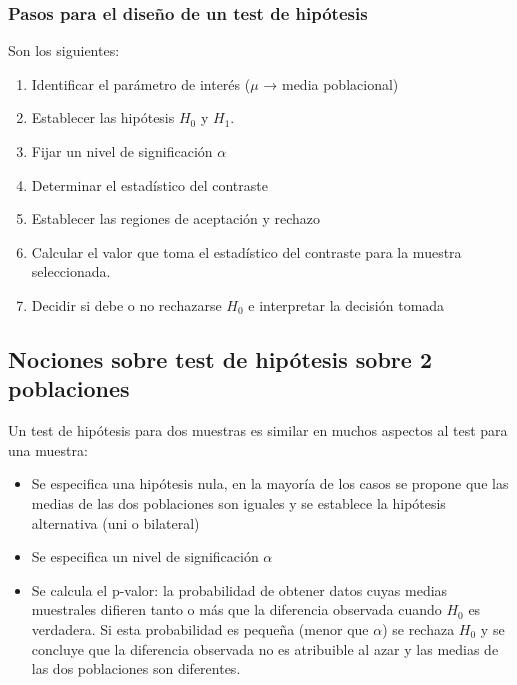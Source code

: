 \documentclass[11pt]{article}
\providecommand{\tightlist}{%
      \setlength{\itemsep}{0pt}\setlength{\parskip}{0pt}}
\begin{document}
\subsubsection{Pasos para el diseño de un test de
hipótesis}\label{pasos-para-el-diseuxf1o-de-un-test-de-hipuxf3tesis}

Son los siguientes:

\begin{enumerate}
\def\labelenumi{\arabic{enumi}.}
\tightlist
\item
  Identificar el parámetro de interés (\(\mu\) → media poblacional)
\item
  Establecer las hipótesis \(H_0\) y \(H_1\).
\item
  Fijar un nivel de significación \(\alpha\)
\item
  Determinar el estadístico del contraste
\item
  Establecer las regiones de aceptación y rechazo
\item
  Calcular el valor que toma el estadístico del contraste para la
  muestra seleccionada.
\item
  Decidir si debe o no rechazarse \(H_0\) e interpretar la decisión
  tomada
\end{enumerate}

    \subsection{Nociones sobre test de hipótesis sobre 2
poblaciones}\label{nociones-sobre-test-de-hipuxf3tesis-sobre-2-poblaciones}

Un test de hipótesis para dos muestras es similar en muchos aspectos al
test para una muestra:

\begin{itemize}
\tightlist
\item
  Se especifica una hipótesis nula, en la mayoría de los casos se
  propone que las medias de las dos poblaciones son iguales y se
  establece la hipótesis alternativa (uni o bilateral)
\item
  Se especifica un nivel de significación \(\alpha\)
\item
  Se calcula el p-valor: la probabilidad de obtener datos cuyas medias
  muestrales difieren tanto o más que la diferencia observada cuando
  \(H_0\) es verdadera. Si esta probabilidad es pequeña (menor que
  \(\alpha\)) se rechaza \(H_0\) y se concluye que la diferencia
  observada no es atribuible al azar y las medias de las dos poblaciones
  son diferentes.
\end{itemize}
\end{document}

